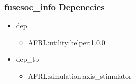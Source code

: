 \subsubsection{fusesoc\_info Depenecies}
\begin{itemize}
\item dep
	\begin{itemize}
	\item AFRL:utility:helper:1.0.0
	\end{itemize}
\item dep\_tb
	\begin{itemize}
	\item AFRL:simulation:axis\_stimulator
	\end{itemize}
\end{itemize}
